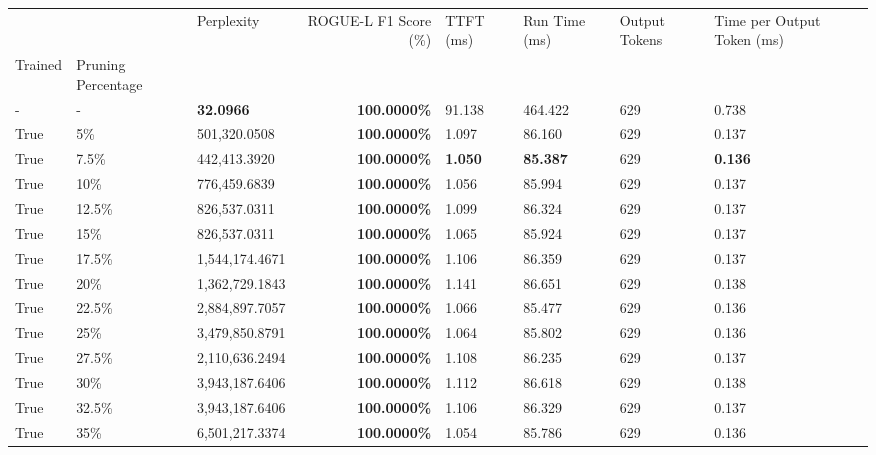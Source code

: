 \begin{table}[H]
\label{tab:evaluation-pipeline-1}
\begin{tabular}{lllrllll}
\toprule
 &  & Perplexity & ROGUE-L F1 Score (\%) & TTFT (ms) & Run Time (ms) & Output Tokens & Time per Output Token (ms) \\
Trained & Pruning Percentage &  &  &  &  &  &  \\
\midrule
- & - & \bfseries 32.0966 & \bfseries 100.0000\% & 91.138 & 464.422 & 629 & 0.738 \\
\cline{1-8} \cline{2-8}
True & 5\% & 501,320.0508 & \bfseries \color{red} 100.0000\% & 1.097 & 86.160 & 629 & 0.137 \\
\cline{1-8} \cline{2-8}
True & 7.5\% & 442,413.3920 & \bfseries \color{red} 100.0000\% & \bfseries \color{red} 1.050 & \bfseries \color{red} 85.387 & 629 & \bfseries \color{red} 0.136 \\
\cline{1-8} \cline{2-8}
True & 10\% & 776,459.6839 & \bfseries \color{red} 100.0000\% & 1.056 & 85.994 & 629 & 0.137 \\
\cline{1-8} \cline{2-8}
True & 12.5\% & 826,537.0311 & \bfseries \color{red} 100.0000\% & 1.099 & 86.324 & 629 & 0.137 \\
\cline{1-8} \cline{2-8}
True & 15\% & 826,537.0311 & \bfseries \color{red} 100.0000\% & 1.065 & 85.924 & 629 & 0.137 \\
\cline{1-8} \cline{2-8}
True & 17.5\% & 1,544,174.4671 & \bfseries \color{red} 100.0000\% & 1.106 & 86.359 & 629 & 0.137 \\
\cline{1-8} \cline{2-8}
True & 20\% & 1,362,729.1843 & \bfseries \color{red} 100.0000\% & 1.141 & 86.651 & 629 & 0.138 \\
\cline{1-8} \cline{2-8}
True & 22.5\% & 2,884,897.7057 & \bfseries \color{red} 100.0000\% & 1.066 & 85.477 & 629 & 0.136 \\
\cline{1-8} \cline{2-8}
True & 25\% & 3,479,850.8791 & \bfseries \color{red} 100.0000\% & 1.064 & 85.802 & 629 & 0.136 \\
\cline{1-8} \cline{2-8}
True & 27.5\% & 2,110,636.2494 & \bfseries \color{red} 100.0000\% & 1.108 & 86.235 & 629 & 0.137 \\
\cline{1-8} \cline{2-8}
True & 30\% & 3,943,187.6406 & \bfseries \color{red} 100.0000\% & 1.112 & 86.618 & 629 & 0.138 \\
\cline{1-8} \cline{2-8}
True & 32.5\% & 3,943,187.6406 & \bfseries \color{red} 100.0000\% & 1.106 & 86.329 & 629 & 0.137 \\
\cline{1-8} \cline{2-8}
True & 35\% & 6,501,217.3374 & \bfseries \color{red} 100.0000\% & 1.054 & 85.786 & 629 & 0.136 \\

\end{tabular}
\end{table}
